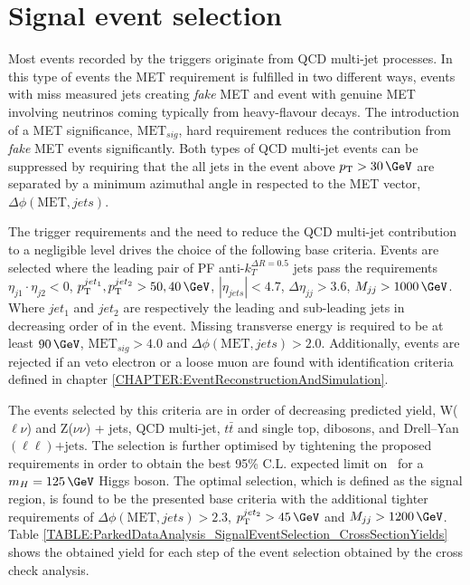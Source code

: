 \section{Signal event selection}
\label{SECTION:ParkedDataAnalysis_SignalEventSelection}


Most events recorded by the triggers originate from \gls{QCD} multi-jet processes. In this type of events the \gls{MET} requirement is fulfilled in two different ways, events with miss measured jets creating \textit{fake} \gls{MET} and event with genuine \gls{MET} involving neutrinos coming typically from heavy-flavour decays. The introduction of a \gls{MET} significance, $\text{MET}_{sig}$, hard requirement reduces the contribution from \textit{fake} \gls{MET} events significantly. Both types of \gls{QCD} multi-jet events can be suppressed by requiring that the all jets in the event above $\pt>30\,\GeV$ are separated by a minimum azimuthal angle in respected to the \gls{MET} vector, $\Delta\phi(\text{MET},jets)$.

The trigger requirements and the need to reduce the \gls{QCD} multi-jet contribution to a negligible level drives the choice of the following base criteria. Events are selected where the leading pair of \gls{PF} anti-$k_T^{\Delta R=0.5}$ jets pass the requirements $\eta_{j1} \cdot \eta_{j2}<0$, $\pt^{jet_1},\pt^{jet_2} > 50,40\,\GeV$, $|\eta_{jets}| < 4.7$, $\Delta\eta_{jj}>3.6$, $M_{jj}>1000\,\GeV$.  Where $jet_1$ and $jet_2$ are respectively the leading and sub-leading jets in decreasing order of \pt in the event. Missing transverse energy is required to be at least $90\,\GeV$, $\text{MET}_{sig}>4.0$ and $\Delta\phi(\text{MET},jets)>2.0$. Additionally, events are rejected if an veto electron or a loose muon are found with identification criteria defined in chapter \ref{CHAPTER:EventReconstructionAndSimulation}.

The events selected by this criteria are in order of decreasing predicted yield, W($\ell\nu$) and Z($\nu\nu$) + jets, \gls{QCD} multi-jet, $t\bar{t}$ and single top, dibosons, and Drell--Yan$(\ell\ell)\text{+jets}$. The selection is further optimised by tightening the proposed requirements in order to obtain the best 95\% C.L. expected limit on \BRinv\, for a $m_H=125\,\GeV$ Higgs boson. The optimal selection, which is defined as the signal region, is found to be the presented base criteria with the additional tighter requirements of $\Delta\phi(\text{MET},jets)>2.3$, $\pt^{jet_2}>45\,\GeV$ and $M_{jj}>1200\,\GeV$. Table \ref{TABLE:ParkedDataAnalysis_SignalEventSelection_CrossSectionYields} shows the obtained yield for each step of the event selection obtained by the cross check analysis.

